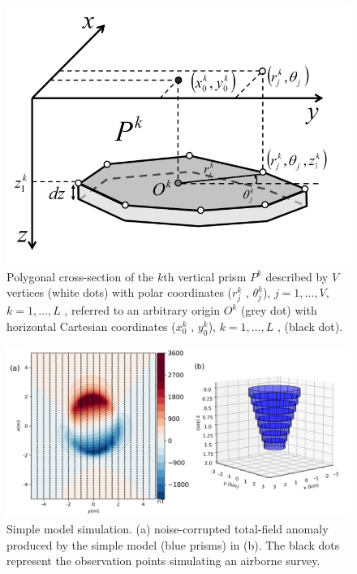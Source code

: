 \begin{figure}
    \centering
    \includegraphics[scale=0.3]{figures/prism_parameters_mod.png}
    \caption{Polygonal cross-section of the $k$th vertical prism $P^k$ described by $V$ vertices (white dots) with polar coordinates ($r^k_j$ , $\theta ^k_j$), $j = 1, \dots, V$, $k = 1, \dots, L$ , referred to an arbitrary origin $O^k$ (grey dot) with horizontal Cartesian coordinates ($x_0^k$ , $y_0^k$), $k = 1, \dots, L$ , (black dot).}
    \label{fig:prism_parameters}
\end{figure}

\begin{figure}
    \centering
    \includegraphics[scale=.5]{figures/wedding_cake_model_data.png}
    \caption{Simple model simulation. (a) noise-corrupted total-field anomaly produced by the simple model (blue prisms) in (b). The black dots represent the observation points simulating an airborne survey.
}
    \label{fig:kimb_model}
\end{figure}

